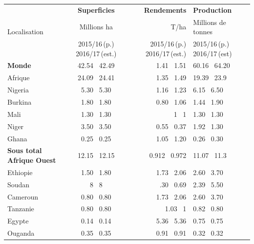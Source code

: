 \documentclass[a4paper,11pt]{article}
\begin{document}
\begin{table}
  \begin{footnotesize}
    \begin{center}
      \begin{tabular}{|l|c|r|p{4cm}|}
        \hline
        \multirow{3}{*}{Localisation} & \textbf{Superficies}      & \textbf{Rendements}  & \textbf{Production}          \\ \cline{2-3} \cline{3-4} \cline{4-4}
                                      & Millions ha      &  T/ha      & Millions de tonnes   \\ 
                                      & 2015/16\,(p.) 2016/17\,(est.) & 2015/16\,(p.)  2016/17\,(est.) & 2015/16\,(p.) 2016/17\,(est)        \\ \hline
        \multirow{1}{*}{\textbf{Monde}} & 42.54  \, 42.49 & 1.41  \, 1.51 & 60.16 \, 64.20 \\ \hline
        \multirow{1}{*}{Afrique} & 24.09 \, 24.41 & 1.35 \, 1.49 & 19.39 \, 23.9 \\ \hline
        \multirow{1}{*}{Nigeria} & 5.30  \, 5.30 & 1.16  \, 1.23 & 6.15 \, 6.50 \\ \hline
        \multirow{1}{*}{Burkina} & 1.80  \, 1.80 & 0.80  \, 1.06 & 1.44 \, 1.90 \\ \hline
        \multirow{1}{*}{Mali} & 1.30  \, 1.30 & 1  \, 1  & 1.30  \, 1.30  \\ \hline
        \multirow{1}{*}{Niger} & 3.50  \, 3.50 & 0.55  \, 0.37  & 1.92  \, 1.30  \\ \hline
        \multirow{1}{*}{Ghana} & 0.25  \, 0.25 & 1.05  \, 1.20  & 0.26  \, 0.30  \\ \hline
        \multirow{1}{*}{\textbf{Sous total Afrique Ouest}} & 12.15  \, 12.15 & 0.912 \, 0.972  & 11.07  \, 11.3  \\ \hline
        \multirow{1}{*}{Ethiopie} & 1.50  \, 1.80 & 1.73  \, 2.06  & 2.60  \, 3.70  \\ \hline
        \multirow{1}{*}{Soudan} & 8  \, 8 & .30  \, 0.69  & 2.39  \, 5.50  \\ \hline
        \multirow{1}{*}{Cameroun} & 0.80  \, 0.80 & 1.73  \, 2.06  & 2.60  \, 3.70  \\ \hline
        \multirow{1}{*}{Tanzanie} & 0.80  \, 0.80 & 1.03  \, 1  & 0.82  \, 0.80  \\ \hline
        \multirow{1}{*}{Egypte} & 0.14  \, 0.14 & 5.36  \, 5.36  & 0.75  \, 0.75  \\ \hline
        \multirow{1}{*}{Ouganda} & 0.35  \, 0.35 & 0.91  \, 0.91  & 0.32  \, 0.32  \\ \hline

\end{tabular}
\end{center}
\end{footnotesize}
\end{table}
\end{document}
